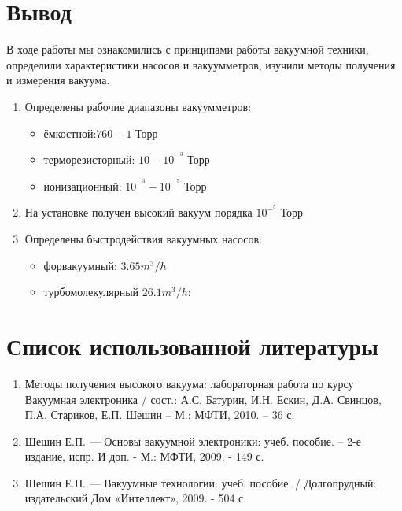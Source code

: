 \documentclass{article}
\begin{document}
\section {Вывод}
В ходе работы мы ознакомились с принципами работы вакуумной техники, определили характеристики насосов и вакуумметров, изучили методы получения и измерения вакуума. 
\begin{enumerate}
\item Определены рабочие диапазоны вакуумметров:
\begin{itemize}
  \item ёмкостной:$760 - 1$ Торр
  \item терморезисторный: $10 - 10^-^3 $ Торр
  \item ионизационный: $10^-^3 - 10^-^5$ Торр
\end{itemize}
\item На установке получен высокий вакуум порядка $10^-^5$ Торр
\item Определены быстродействия вакуумных насосов:
\begin{itemize}
  \item форвакуумный: $3.65 m^3/h$
  \item турбомолекулярный $26.1 m^3/h$: 
\end{itemize}
\end{enumerate}

\section{Список использованной литературы}
\begin{enumerate}
\item Методы получения высокого вакуума: лабораторная работа по курсу Вакуумная электроника / сост.: А.С. Батурин, И.Н. Ескин, Д.А. Свинцов, П.А. Стариков, Е.П. Шешин – М.: МФТИ, 2010. – 36 с.
\item Шешин Е.П. — Основы вакуумной электроники: учеб. пособие. – 2-е издание, испр. И доп. - М.: МФТИ, 2009.  - 149 с.
\item Шешин Е.П. — Вакуумные технологии: учеб. пособие. / 
Долгопрудный: издательский Дом «Интеллект», 2009.  - 504 с.
\end{enumerate}
\end{document}
